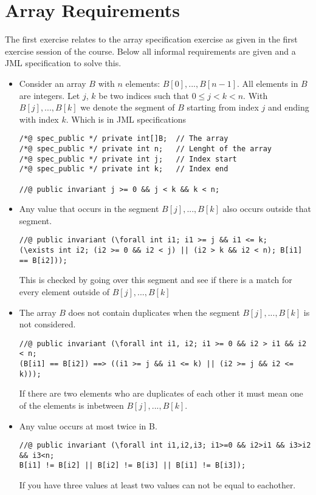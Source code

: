 \documentclass[a4paper]{article}
\begin{document}
	\section{Array Requirements}
	The first exercise relates to the array specification exercise as given in the first exercise session of the course. Below all informal requirements are given and a JML specification to solve this.
	\begin{itemize}
		\item Consider an array $B$ with $n$ elements: $B[0], . . . , B[n-1]$.
		All elements in $B$ are integers. Let $j$, $k$ be two indices such that $0 \leq j < k < n$.
		With $B[j], . . . , B[k]$ we denote the segment of $B$ starting from index $j$ and ending with index $k$. Which is in JML specifications
		\begin{lstlisting}
/*@ spec_public */ private int[]B;	// The array
/*@ spec_public */ private int n;	// Lenght of the array
/*@ spec_public */ private int j;	// Index start
/*@ spec_public */ private int k;	// Index end
		
//@ public invariant j >= 0 && j < k && k < n;
		\end{lstlisting}
		
		\item Any value that occurs in the segment $B[j], . . . ,B[k]$ also occurs outside that segment.
		\begin{lstlisting}
//@ public invariant (\forall int i1; i1 >= j && i1 <= k;
(\exists int i2; (i2 >= 0 && i2 < j) || (i2 > k && i2 < n); B[i1] == B[i2]));
		\end{lstlisting}
		This is checked by going over this segment and see if there is a match for every element outside of $B[j], . . . , B[k]$
		
		\item The array $B$ does not contain duplicates when the segment $B[j], . . . , B[k]$ is not considered.
		\begin{lstlisting}
//@ public invariant (\forall int i1, i2; i1 >= 0 && i2 > i1 && i2 < n;
(B[i1] == B[i2]) ==> ((i1 >= j && i1 <= k) || (i2 >= j && i2 <= k)));
		\end{lstlisting}
		If there are two elements who are duplicates of each other it must mean one of the elements is inbetween $B[j], . . . , B[k]$.
		
		\item Any value occurs at most twice in B.
		\begin{lstlisting}
//@ public invariant (\forall int i1,i2,i3; i1>=0 && i2>i1 && i3>i2 && i3<n;
B[i1] != B[i2] || B[i2] != B[i3] || B[i1] != B[i3]);	
		\end{lstlisting}
		If you have three values at least two values can not be equal to eachother.
		

\end{itemize}
\end{document}
